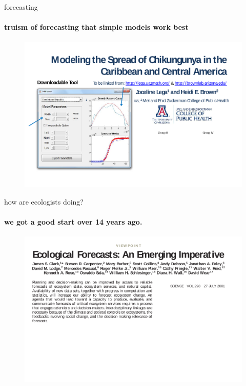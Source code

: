 \documentclass[show notes]{beamer}
\begin{document}
\begin{frame}{forecasting}
  \framesubtitle{truism of forecasting that simple models work best}

	\begin{figure}
	\includegraphics[width=\textwidth]{chikungunja-forecast-challenge.pdf}
  	\end{figure}
  
\end{frame}

\begin{frame}{how are ecologists doing?}
  \framesubtitle{we got a good start over 14 years ago.} 
  
  \begin{figure}
  \includegraphics[width=\textwidth]{forecasts-are-good.pdf}
  \end{figure}
  
\end{frame}
\end{document}
